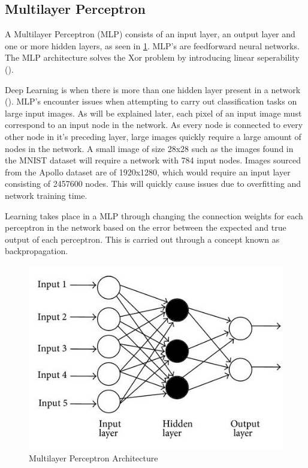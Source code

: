 \documentclass[12pt]{report}
\begin{document}
\subsection{Multilayer Perceptron}
\begin{flushleft}
A Multilayer Perceptron (MLP) consists of an input layer, an output layer and one or more hidden layers, as seen in \ref{fig:mlp}. MLP's are feedforward neural networks. The MLP architecture solves the Xor problem by introducing linear seperability (\cite{Singh2016MinimumCM}).

Deep Learning is when there is more than one hidden layer present in a network (\cite{o2015introduction}). MLP's encounter issues when attempting to carry out classification tasks on large input images. As will be explained later, each pixel of an input image must correspond to an input node in the network. As every node is connected to every other node in it's preceding layer, large images quickly require a large amount of nodes in the network. A small image of size 28x28 such as the images found in the MNIST dataset will require a network with 784 input nodes. Images sourced from the Apollo dataset are of 1920x1280, which would require an input layer consisting of 2457600 nodes. This will quickly cause issues due to overfitting and network training time.

Learning takes place in a MLP through changing the connection weights for each perceptron in the network based on the error between the expected and true output of each perceptron. This is carried out through a concept known as backpropagation.
\end{flushleft}

\vspace{0.5cm}
\begin{figure}[h]
	\centering
	\includegraphics[width=12cm]{mlp}
	\caption{Multilayer Perceptron Architecture}
	\label{fig:mlp}
\end{figure}
\end{document}

